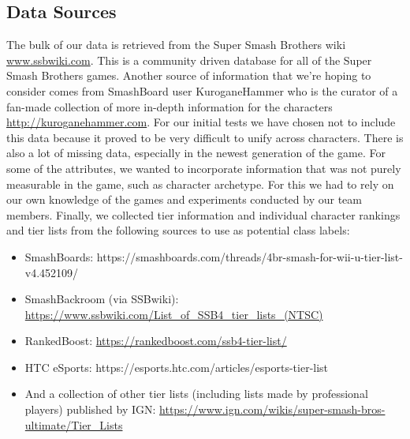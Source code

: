 \documentclass{article}
\begin{document}
\subsection{Data Sources}
The bulk of our data is retrieved from the Super Smash Brothers wiki \url{www.ssbwiki.com}. This is a community driven database for all of the Super Smash Brothers games. Another source of information that we’re hoping to consider comes from SmashBoard user KuroganeHammer who is the curator of a fan-made collection of more in-depth information for the characters \url{http://kuroganehammer.com}. For our initial tests we have chosen not to include this data because it proved to be very difficult to unify across characters. There is also a lot of missing data, especially in the newest generation of the game.
For some of the attributes, we wanted to incorporate information that was not purely measurable in the game, such as character archetype. For this we had to rely on our own knowledge of the games and experiments conducted by our team members.
Finally, we collected tier information and individual character rankings and tier lists from the following sources to use as potential class labels:
\begin{itemize}
  \item SmashBoards: https://smashboards.com/threads/4br-smash-for-wii-u-tier-list-v4.452109/ 
  \item SmashBackroom (via SSBwiki): \url{https://www.ssbwiki.com/List\_of\_SSB4\_tier\_lists\_(NTSC)}
  \item RankedBoost: \url{https://rankedboost.com/ssb4-tier-list/}
  \item HTC eSports: https://esports.htc.com/articles/esports-tier-list 
  \item And a collection of other tier lists (including lists made by professional players) published by IGN: \url{https://www.ign.com/wikis/super-smash-bros-ultimate/Tier\_Lists}
\end{itemize}
\end{document}
